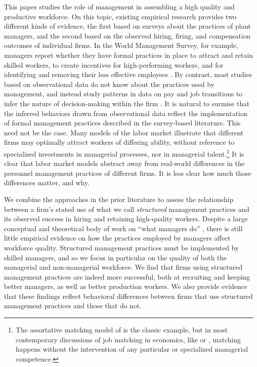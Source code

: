 
This paper studies the role of management in assembling a high quality and productive workforce. On this topic, existing empirical research provides two different kinds of evidence, the first based on surveys about the practices of plant managers, and the second based on the observed hiring, firing, and compensation outcomes of individual firms. 
In the World Management Survey, for example, managers report whether they have formal practices in place to attract and retain skilled workers, to create incentives for high-performing workers, and for identifying and removing their less effective employees \citep{Bloom2012}. 
By contrast, most studies based on observational data do not know about the practices used by management, and instead study patterns in data on pay and job transitions to infer the nature of decision-making within the firm \citep[e.g.][]{AbowdKramarzRoux:EJ:2006,Hensvik2018}.
It is natural to surmise that the inferred behaviors drawn from observational data reflect the implementation of formal management practices described in the survey-based literature. This need not be the case. Many models of the labor market illustrate that different firms may optimally attract workers of differing ability, without reference to specialized investments in managerial processes, nor in managerial talent.\footnote{The assortative matching model of \citet{becker1973theory} is the classic example, but in most contemporary discussions of job matching in economics, like \citet{Card:FirmsIneq:JOLE:2017} or \citet{Sorkin:Ranking:QJE:2018}, matching happens without the intervention of any particular or specialized managerial competence.} It is clear that labor market models abstract away from real-world differences in the personnel management practices of different firms. It is less clear how much those differences matter, and why.

We combine the approaches in the prior literature to assess the relationship between a firm's stated use of what we call \emph{structured} management practices and its observed success in hiring and retaining high-quality workers. Despite a large conceptual and theoretical body of work on ``what managers do'' \citep{gibbonshenderson_2012}, there is still little empirical evidence on how the practices employed by managers affect workforce quality. Structured management practices must be implemented by skilled managers, %
 and so we focus in particular on the quality of both the managerial and non-managerial workforce. We find that firms using structured management practices are indeed more successful, both at recruiting and keeping better managers, as well as better production workers. We also provide evidence that these findings reflect behavioral differences between firms that use structured management practices and those that do not.

